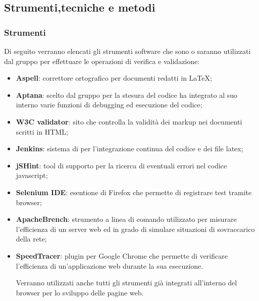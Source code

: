 
\subsection{Strumenti,tecniche e metodi}

\subsubsection{Strumenti}
\label{sec:strumenti}
Di seguito verranno elencati gli strumenti software che sono o saranno utilizzati dal gruppo per effettuare le operazioni di verifica e validazione:
\begin{itemize}

\item \textbf{Aspell}: correttore ortografico per documenti redatti in \LaTeX;

\item \textbf{Aptana}: scelto dal gruppo per la stesura del codice ha integrato al suo interno varie funzioni di debugging ed esecuzione del codice;

\item \textbf{W3C validator}: sito che controlla la validità dei markup nei documenti scritti in HTML;

\item \textbf{Jenkins}: sistema di per l'integrazione continua del codice e dei file latex;

\item \textbf{jSHint}: tool di supporto per la ricerca di eventuali errori nel codice javascript;

\item \textbf{Selenium IDE}: esentione di Firefox che permette di registrare test tramite browser;

\item \textbf{ApacheBrench}: strumento a linea di comando utilizzato per misurare l’efficienza di un server web ed in grado di simulare situazioni di sovraccarico della rete;

\item \textbf{SpeedTracer}: plugin per Google Chrome che permette di verificare l’efficienza di un’applicazione web durante la sua esecuzione.

Verranno utilizzati anche tutti gli strumenti già integrati all'interno del browser per lo sviluppo delle pagine web.

\end{itemize}
